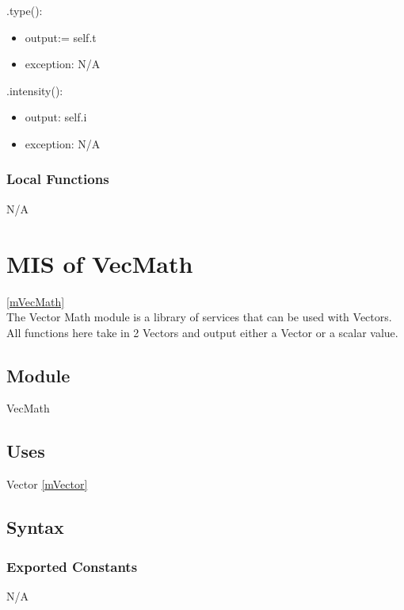 \documentclass[12pt, titlepage]{article}
\begin{document}
\noindent .type():
\begin{itemize}
	\item output:= self.t\\
	\item exception: N/A\\
\end{itemize}

\noindent .intensity():
\begin{itemize}
	\item output: self.i\\
	\item exception: N/A\\
\end{itemize}

\subsubsection{Local Functions}
N/A

\newpage


\section{MIS of VecMath} \ref{mVecMath} \\
The Vector Math module is a library of services that can be used with Vectors. 
All functions here take in 2 Vectors and output either a Vector or a scalar 
value.

\subsection{Module}
VecMath

\subsection{Uses}
Vector \ref{mVector}\\

\subsection{Syntax}
\subsubsection{Exported Constants}
N/A
\end{document}
